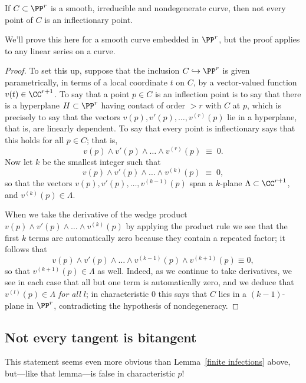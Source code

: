 \begin{lemma}\label{finite infections}
If $C \subset \PP^r$ is a smooth, irreducible and nondegenerate curve, then not every point of $C$ is an inflectionary point.
\end{lemma}

We'll prove this here for a smooth curve embedded in $\PP^r$, but the proof applies to any linear series on a curve.

\begin{proof}
To set this up, suppose that the inclusion $C \hookrightarrow \PP^r$ is given parametrically, in terms of a local coordinate $t$ on $C$, by a vector-valued function $v(t) \in \CC^{r+1}$. To say that a point $p \in C$ is an inflection point is to say that there is a hyperplane $H \subset \PP^r$ having contact of order $>r$ with $C$ at $p$, which is
precisely to say that the vectors $v(p), v'(p), \dots, v^{(r)}(p)$ lie in a hyperplane, that is, are linearly dependent. To say that every point is inflectionary says that this holds for all $p \in C$; that is,
$$
v(p) \wedge v'(p) \wedge \dots \wedge v^{(r)}(p) \; \equiv \; 0.
$$
Now let $k$ be the smallest integer such that
$$
v(p) \wedge v'(p) \wedge \dots \wedge v^{(k)}(p) \; \equiv \; 0,
$$
so that the vectors $v(p), v'(p), \dots, v^{(k-1)}(p)$ span a $k$-plane $\Lambda \subset \CC^{r+1}$, and $v^{(k)}(p) \in \Lambda$.

When we take the derivative of the wedge product $v(p) \wedge v'(p) \wedge \dots \wedge v^{(k)}(p)$ by applying the product rule we see that the first $k$ terms are automatically zero because they contain a repeated factor; it follows that
$$
v(p) \wedge v'(p) \wedge \dots \wedge v^{(k-1)}(p)\wedge v^{(k+1)}(p) \equiv 0,
$$
so that $v^{(k+1)}(p) \in \Lambda$ as well. Indeed, as we continue to take derivatives, we see in each case that all but one term is automatically zero, and we deduce that \emph{$v^{(l)}(p) \in \Lambda$ for all $l$}; in characteristic 0 this says that $C$ lies in a $(k-1)$-plane in $\PP^r$, contradicting the hypothesis of nondegeneracy.
\end{proof}

 \subsection{Not every tangent is bitangent}
 
 This statement seems even more obvious than Lemma~\ref{finite infections} above, but---like that lemma---is false in characteristic $p$!
 
